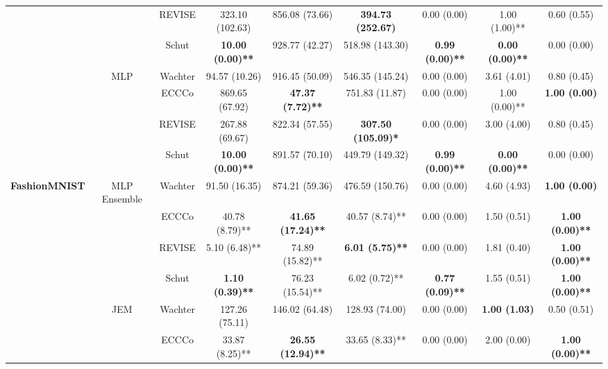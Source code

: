 \begin{table}
{\begin{tabular}[t]{>{}c|c|c|c|c|c|c|c|c}
 &  & REVISE & 323.10 (102.63) & 856.08 (73.66) & \textbf{394.73 (252.67)} & 0.00 (0.00) & 1.00 (1.00)** & 0.60 (0.55)\\

 &  & Schut & \textbf{10.00 (0.00)**} & 928.77 (42.27) & 518.98 (143.30) & \textbf{0.99 (0.00)**} & \textbf{0.00 (0.00)**} & 0.00 (0.00)\\

 & \multirow{-4}{*}{\centering\arraybackslash MLP} & Wachter & 94.57 (10.26) & 916.45 (50.09) & 546.35 (145.24) & 0.00 (0.00) & 3.61 (4.01) & 0.80 (0.45)\\
\cline{2-9}
 &  & ECCCo & 869.65 (67.92) & \textbf{47.37 (7.72)**} & 751.83 (11.87) & 0.00 (0.00) & 1.00 (0.00)** & \textbf{1.00 (0.00)}\\

 &  & REVISE & 267.88 (69.67) & 822.34 (57.55) & \textbf{307.50 (105.09)*} & 0.00 (0.00) & 3.00 (4.00) & 0.80 (0.45)\\

 &  & Schut & \textbf{10.00 (0.00)**} & 891.57 (70.10) & 449.79 (149.32) & \textbf{0.99 (0.00)**} & \textbf{0.00 (0.00)**} & 0.00 (0.00)\\

\multirow{-16}{*}{\centering\arraybackslash \textbf{FashionMNIST}} & \multirow{-4}{*}{\centering\arraybackslash MLP Ensemble} & Wachter & 91.50 (16.35) & 874.21 (59.36) & 476.59 (150.76) & 0.00 (0.00) & 4.60 (4.93) & \textbf{1.00 (0.00)}\\
\cline{1-9}
 &  & ECCCo & 40.78 (8.79)** & \textbf{41.65 (17.24)**} & 40.57 (8.74)** & 0.00 (0.00) & 1.50 (0.51) & \textbf{1.00 (0.00)**}\\

 &  & REVISE & 5.10 (6.48)** & 74.89 (15.82)** & \textbf{6.01 (5.75)**} & 0.00 (0.00) & 1.81 (0.40) & \textbf{1.00 (0.00)**}\\

 &  & Schut & \textbf{1.10 (0.39)**} & 76.23 (15.54)** & 6.02 (0.72)** & \textbf{0.77 (0.09)**} & 1.55 (0.51) & \textbf{1.00 (0.00)**}\\

 & \multirow{-4}{*}{\centering\arraybackslash JEM} & Wachter & 127.26 (75.11) & 146.02 (64.48) & 128.93 (74.00) & 0.00 (0.00) & \textbf{1.00 (1.03)} & 0.50 (0.51)\\
\cline{2-9}
 &  & ECCCo & 33.87 (8.25)** & \textbf{26.55 (12.94)**} & 33.65 (8.33)** & 0.00 (0.00) & 2.00 (0.00) & \textbf{1.00 (0.00)**}\\


\end{tabular}}
\end{table}
